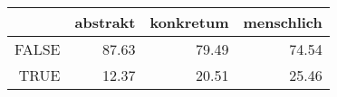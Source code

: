 \begin{tabular}{rrrr}
  \hline
 & abstrakt & konkretum & menschlich \\ 
  \hline
FALSE & 87.63 & 79.49 & 74.54 \\ 
  TRUE & 12.37 & 20.51 & 25.46 \\ 
   \hline
\end{tabular}
